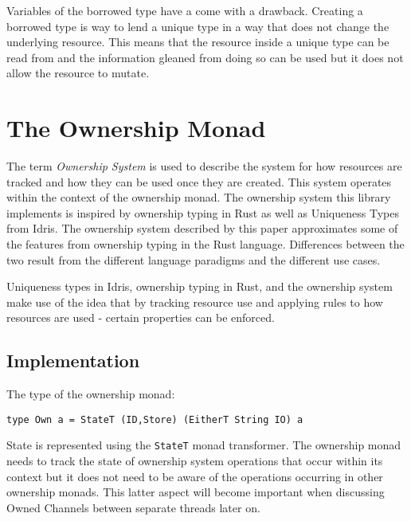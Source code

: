 \documentclass[onehalf,11pt]{beavtex}
\begin{document}

Variables of the borrowed type have a come with a drawback. Creating
a borrowed type is way to lend a unique type in a way that does
not change the underlying resource. This means that the resource inside
a unique type can be read from and the information gleaned from doing so can be
used but it does not allow the resource to mutate.


\chapter{The Ownership Monad}

The term \textit{Ownership System} is used to describe the system for how
resources are tracked and how they can be used once they are created. This
system operates within the context of the ownership monad.
The ownership system this library implements is inspired by
ownership typing in Rust as well as Uniqueness Types
from Idris.\cite{rust_book_ownership} \cite{idris_uniqueness_types}
The ownership system described by this paper approximates some of the
features from ownership typing in the Rust language. Differences between
the two result from the different language paradigms and the different use
cases.

Uniqueness types in Idris, ownership typing in Rust, and the ownership system
make use of the idea that by tracking resource use and applying rules to how
resources are used - certain properties can be enforced.

\section{Implementation}

The type of the ownership monad:

\begin{verbatim}
type Own a = StateT (ID,Store) (EitherT String IO) a
\end{verbatim}


State is represented using the \texttt{StateT} monad transformer.
The ownership monad needs to track the state of ownership system operations
that occur within its context but it does not need to be aware of the
operations occurring in other ownership monads.
This latter aspect will become important when discussing Owned Channels between
separate threads later on.
\end{document}

